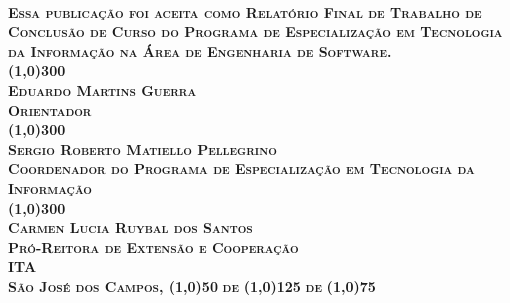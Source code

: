 \begin{titlepage}
\begin{center}
	\large \bfseries \scshape \tcctitle \\[2cm]	
	\normalfont
	\normalsize Essa publicação foi aceita como Relatório Final de Trabalho de Conclusão de Curso do Programa de Especialização em Tecnologia da Informação na Área de Engenharia de Software.\\[2cm]

	\line(1,0){300}\\
	\normalsize Eduardo Martins Guerra\\
	\normalsize Orientador\\[2cm]

	\line(1,0){300}\\
	\normalsize Sergio Roberto Matiello Pellegrino\\
	\normalsize Coordenador do Programa de Especialização em Tecnologia da Informação\\[2cm]

	\line(1,0){300}\\
	\normalsize Carmen Lucia Ruybal dos Santos\\
	\normalsize Pró-Reitora de Extensão e Cooperação\\[2cm]
	
	\LARGE \bfseries ITA\\[1cm]
	\normalsize São José dos Campos, \line(1,0){50}\,\,de\,\,\line(1,0){125}\,\,de\,\,\line(1,0){75}

\end{center}
\end{titlepage}